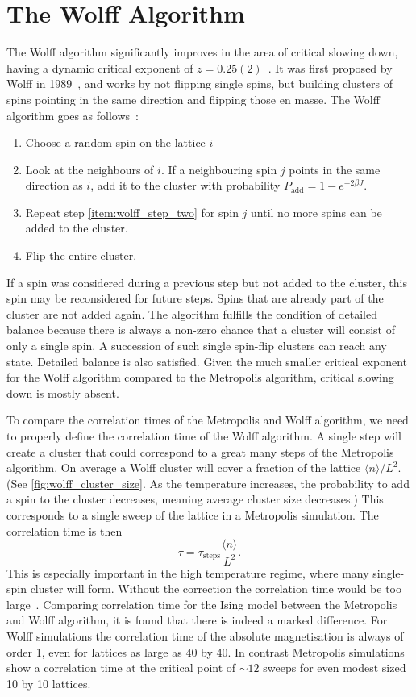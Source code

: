 \documentclass[11pt, a4paper]{report} %
\begin{document}
\section{The Wolff Algorithm}
The Wolff algorithm significantly improves in the area of critical slowing down, having a dynamic critical exponent of \(z=0.25(2)\)~\cite{newman:1999}.
It was first proposed by Wolff in 1989~\cite{wolff:1989}, and works by not flipping single spins, but building clusters of spins pointing in the same direction and flipping those en masse.
The Wolff algorithm goes as follows~\cite{landau:2015,newman:1999}:
\begin{enumerate}
	\item Choose a random spin on the lattice \(i\)
	\item\label{item:wolff_step_two} Look at the neighbours of \(i\). If a neighbouring spin \(j\) points in the same direction as \(i\), add it to the cluster with probability \(P_{\mathrm{add}} = 1 - e^{-2\beta J}\).
	\item Repeat step \ref{item:wolff_step_two} for spin \(j\) until no more spins can be added to the cluster.
	\item Flip the entire cluster.
\end{enumerate}
If a spin was considered during a previous step but not added to the cluster, this spin may be reconsidered for future steps.
Spins that are already part of the cluster are not added again.
The algorithm fulfills the condition of detailed balance because there is always a non-zero chance that a cluster will consist of only a single spin.
A succession of such single spin-flip clusters can reach any state. Detailed balance is also satisfied.
Given the much smaller critical exponent for the Wolff algorithm compared to the Metropolis algorithm, critical slowing down is mostly absent.

To compare the correlation times of the Metropolis and Wolff algorithm, we need to properly define the correlation time of the Wolff algorithm.
A single step will create a cluster that could correspond to a great many steps of the Metropolis algorithm.
On average a Wolff cluster will cover a fraction of the lattice \(\langle n \rangle / L^2\). (See \cref{fig:wolff_cluster_size}. As the temperature increases, the probability to add a spin to the cluster decreases, meaning average cluster size decreases.)
This corresponds to a single sweep of the lattice in a Metropolis simulation.
The correlation time is then
\begin{equation}
	\tau = \tau_{\mathrm{steps}} \frac{\langle n \rangle}{L^2}.
\end{equation}
This is especially important in the high temperature regime, where many single-spin cluster will form.
Without the correction the correlation time would be too large~\cite{newman:1999}.
Comparing correlation time for the Ising model between the Metropolis and Wolff algorithm, it is found that there is indeed a marked difference.
For Wolff simulations the correlation time of the absolute magnetisation is always of order 1, even for lattices as large as 40 by 40.
In contrast Metropolis simulations show a correlation time at the critical point of \(\sim 12\) sweeps for even modest sized 10 by 10 lattices.
\end{document}
